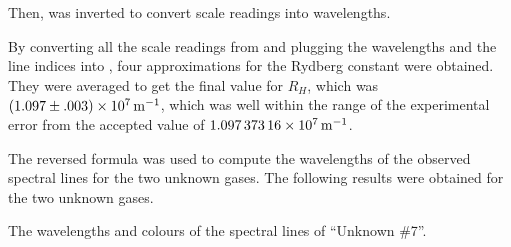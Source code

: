 \begin{paper}
Then, \eqHartmann was inverted to convert scale readings into wavelengths.


By converting all the scale readings from \figHydrogen and plugging the
wavelengths and the line indices into \eqRydberg, four approximations
for the Rydberg constant were obtained.
They were averaged to get the final value for $R_H$, which was
$(1.097\pm.003)\times\SI{E7}{\per\meter}$, which was well within the range of the
experimental error from the accepted value of $\SI{1.09737316E7}{\per\meter}$.

The reversed formula was used to compute the wavelengths of the observed
spectral lines for the two unknown gases.
The following results were obtained for the two unknown gases.

{The wavelengths and colours of the spectral lines of ``Unknown \#7''.}\vspace{1em}


\end{paper}
